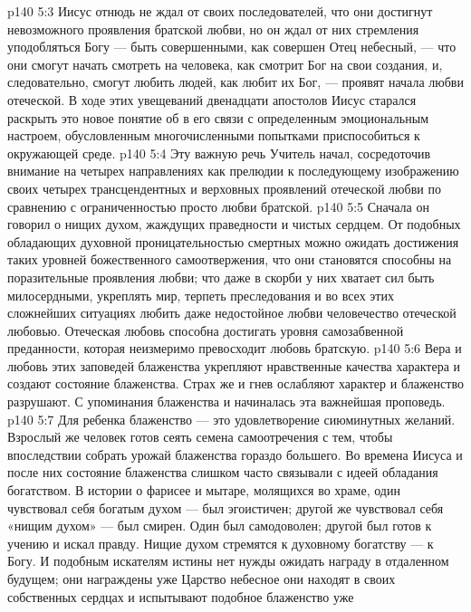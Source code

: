 \vs p140 5:3 Иисус отнюдь не ждал от своих последователей, что они достигнут невозможного проявления братской любви, но он ждал от них стремления уподобляться Богу --- быть совершенными, как совершен Отец небесный, --- что они смогут начать смотреть на человека, как смотрит Бог на свои создания, и, следовательно, смогут любить людей, как любит их Бог, --- проявят начала любви отеческой. В ходе этих увещеваний двенадцати апостолов Иисус старался раскрыть это новое понятие об  в его связи с определенным эмоциональным настроем, обусловленным многочисленными попытками приспособиться к окружающей среде.
\vs p140 5:4 \pc Эту важную речь Учитель начал, сосредоточив внимание на четырех направлениях  как прелюдии к последующему изображению своих четырех трансцендентных и верховных проявлений отеческой любви по сравнению с ограниченностью просто любви братской.
\vs p140 5:5 Сначала он говорил о нищих духом, жаждущих праведности и чистых сердцем. От подобных обладающих духовной проницательностью смертных можно ожидать достижения таких уровней божественного самоотвержения, что они становятся способны на поразительные проявления  любви; что даже в скорби у них хватает сил быть милосердными, укреплять мир, терпеть преследования и во всех этих сложнейших ситуациях любить даже недостойное любви человечество отеческой любовью. Отеческая любовь способна достигать уровня самозабвенной преданности, которая неизмеримо превосходит любовь братскую.
\vs p140 5:6 Вера и любовь этих заповедей блаженства укрепляют нравственные качества характера и создают состояние блаженства. Страх же и гнев ослабляют характер и блаженство разрушают. С упоминания блаженства и начиналась эта важнейшая проповедь.
\vs p140 5:7 \bibnobreakspace {} Для ребенка блаженство --- это удовлетворение сиюминутных желаний. Взрослый же человек готов сеять семена самоотречения с тем, чтобы впоследствии собрать урожай блаженства гораздо большего. Во времена Иисуса и после них состояние блаженства слишком часто связывали с идеей обладания богатством. В истории о фарисее и мытаре, молящихся во храме, один чувствовал себя богатым духом --- был эгоистичен; другой же чувствовал себя «нищим духом» --- был смирен. Один был самодоволен; другой был готов к учению и искал правду. Нищие духом стремятся к духовному богатству --- к Богу. И подобным искателям истины нет нужды ожидать награду в отдаленном будущем; они награждены уже  Царство небесное они находят в своих собственных сердцах и испытывают подобное блаженство уже 
